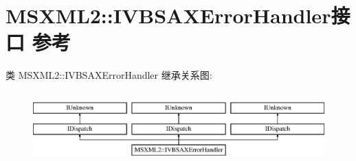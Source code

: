\hypertarget{interface_m_s_x_m_l2_1_1_i_v_b_s_a_x_error_handler}{}\section{M\+S\+X\+M\+L2\+:\+:I\+V\+B\+S\+A\+X\+Error\+Handler接口 参考}
\label{interface_m_s_x_m_l2_1_1_i_v_b_s_a_x_error_handler}
类 M\+S\+X\+M\+L2\+:\+:I\+V\+B\+S\+A\+X\+Error\+Handler 继承关系图\+:\begin{figure}[H]
\begin{center}
\leavevmode
\includegraphics[height=2.800000cm]{interface_m_s_x_m_l2_1_1_i_v_b_s_a_x_error_handler}
\end{center}
\end{figure}

